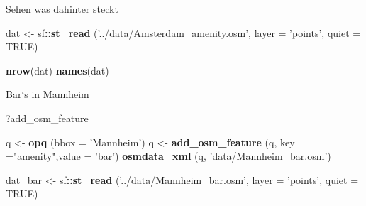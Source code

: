 \documentclass[ignorenonframetext,]{beamer}
\newenvironment{Shaded}{\begin{snugshade}}{\end{snugshade}}
\newcommand{\DataTypeTok}[1]{\textcolor[rgb]{0.13,0.29,0.53}{#1}}
\newcommand{\KeywordTok}[1]{\textcolor[rgb]{0.13,0.29,0.53}{\textbf{#1}}}
\newcommand{\NormalTok}[1]{#1}
\newcommand{\OperatorTok}[1]{\textcolor[rgb]{0.81,0.36,0.00}{\textbf{#1}}}
\newcommand{\OtherTok}[1]{\textcolor[rgb]{0.56,0.35,0.01}{#1}}
\newcommand{\StringTok}[1]{\textcolor[rgb]{0.31,0.60,0.02}{#1}}
\begin{document}
\begin{frame}[fragile]{Sehen was dahinter steckt}
\protect\hypertarget{sehen-was-dahinter-steckt}{}

\begin{Shaded}
\begin{Highlighting}[]
\NormalTok{dat <-}\StringTok{ }\NormalTok{sf}\OperatorTok{::}\KeywordTok{st_read}\NormalTok{ (}\StringTok{'../data/Amsterdam_amenity.osm'}\NormalTok{, }
                    \DataTypeTok{layer =} \StringTok{'points'}\NormalTok{, }
                    \DataTypeTok{quiet =} \OtherTok{TRUE}\NormalTok{)}
\end{Highlighting}
\end{Shaded}

\begin{Shaded}
\begin{Highlighting}[]
\KeywordTok{nrow}\NormalTok{(dat)}
\KeywordTok{names}\NormalTok{(dat)}
\end{Highlighting}
\end{Shaded}

\end{frame}

\begin{frame}[fragile]{Bar`s in Mannheim}
\protect\hypertarget{bars-in-mannheim}{}

\begin{Shaded}
\begin{Highlighting}[]
\NormalTok{?add_osm_feature}
\end{Highlighting}
\end{Shaded}

\begin{Shaded}
\begin{Highlighting}[]
\NormalTok{q <-}\StringTok{ }\KeywordTok{opq}\NormalTok{ (}\DataTypeTok{bbox =} \StringTok{'Mannheim'}\NormalTok{)}
\NormalTok{q <-}\StringTok{ }\KeywordTok{add_osm_feature}\NormalTok{ (q, }\DataTypeTok{key =}\StringTok{"amenity"}\NormalTok{,}\DataTypeTok{value =} \StringTok{'bar'}\NormalTok{) }
\KeywordTok{osmdata_xml}\NormalTok{ (q, }\StringTok{'data/Mannheim_bar.osm'}\NormalTok{)}
\end{Highlighting}
\end{Shaded}

\begin{Shaded}
\begin{Highlighting}[]
\NormalTok{dat_bar <-}\StringTok{ }\NormalTok{sf}\OperatorTok{::}\KeywordTok{st_read}\NormalTok{ (}\StringTok{'../data/Mannheim_bar.osm'}\NormalTok{, }
                        \DataTypeTok{layer =} \StringTok{'points'}\NormalTok{, }\DataTypeTok{quiet =} \OtherTok{TRUE}\NormalTok{)}
\end{Highlighting}
\end{Shaded}

\end{frame}
\end{document}
